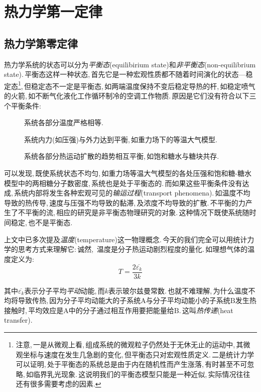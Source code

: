 \chapter{热力学第一定律}





\section{热力学第零定律}
热力学系统的状态可以分为\emph{平衡态}(equilibirium state)和\emph{非平衡态}(non-equilibrium state).\,平衡态这样一种状态,\,首先它是一种宏观性质都不随着时间演化的状态---稳定态\footnote{注意,\,一是从微观上看,\,组成系统的微观粒子仍然处于无休无止的运动中,\,其微观坐标与速度在发生几急剧的变化,\,但平衡态只对宏观性质定义.\,二是统计力学可以证明,\,处于平衡态的系统总是由于内在随机性而产生涨落,\,有时甚至不可忽略,\,如临界乳光现象.\,这说明我们的平衡态模型只能是一种近似,\,实际情况往往还有很多需要考虑的因素.},\,但稳定态不一定是平衡态,\,如两端温度保持不变后稳定导热的杆,\,如稳定喷气的火箭,\,如不断气化液化工作循环制冷的空调工作物质.\,原因是它们没有符合以下三个平衡条件:
\begin{description}
	\item[\quad {}]	系统各部分温度严格相等.
	\item[\quad {}]	系统内力(如压强)与外力达到平衡,\,如重力场下的等温大气模型.
	\item[\quad {}] 	系统各部分热运动扩散的趋势相互平衡,\,如饱和糖水与糖块共存.
\end{description}

可以发现,\,既使系统状态不均匀,\,如重力场等温大气模型的各处压强和饱和糖-糖水模型中的两相糖分子数密度,\,系统也是处于平衡态的.\,而如果这些平衡条件没有达成,\,系统内部将发生各种宏观可见的\emph{输运过程}(transport phenomena).\,如温度不均导致的热传导,\,速度与压强不均导致的黏滞,\,及浓度不均导致的扩散.\,不平衡的力产生了不平衡的流,\,相应的研究是非平衡态物理研究的对象.\,这种情况下既使系统随时间稳定,\,也不是平衡态.

上文中已多次提及\emph{温度}(temperature)这一物理概念.\,今天的我们完全可以用统计力学的思考方式来理解它:\,诚然,\,{ 温度是分子热运动剧烈程度的量化}.\,如理想气体的温度定义为:
\[T=\frac{2\overline{\varepsilon_k}}{3k}\]

其中$\overline{\varepsilon_k}$表示分子平均\emph{平动}动能,\,而$k$表示玻尔兹曼常数.\,也就不难理解,\,为什么温度不均将导致传热,\,因为分子平均动能大的子系统$\mathrm{A}$与分子平均动能小的子系统$\mathrm{B}$发生热接触时,\,平均效应是$\mathrm{A}$中的分子通过相互作用要把能量给$\mathrm{B}$.\,这叫\emph{热传递}(heat transfer).


